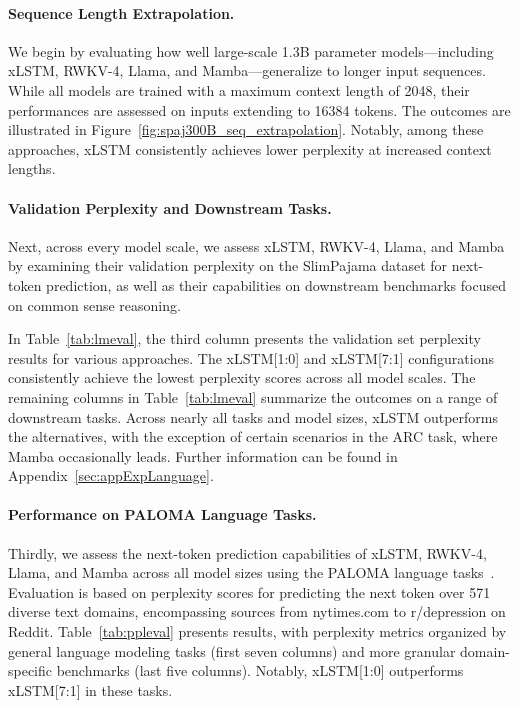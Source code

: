 \paragraph{Sequence Length Extrapolation.}
\label{sec:spaj300B_ctx_extrapolation}
We begin by evaluating how well large-scale 1.3B parameter models—including xLSTM, RWKV-4, Llama, and Mamba—generalize to longer input sequences. While all models are trained with a maximum context length of 2048, their performances are assessed on inputs extending to 16384 tokens. The outcomes are illustrated in Figure~\ref{fig:spaj300B_seq_extrapolation}. Notably, among these approaches, xLSTM consistently achieves lower perplexity at increased context lengths.

\paragraph{Validation Perplexity and Downstream Tasks.}
\label{sec:spaj_downstream_eval}
Next, across every model scale, we assess xLSTM, RWKV-4, Llama, and Mamba by examining their validation perplexity on the SlimPajama dataset for next-token prediction, as well as their capabilities on downstream benchmarks focused on common sense reasoning.

In Table~\ref{tab:lmeval}, the third column presents the validation set perplexity results for various approaches. The xLSTM[1:0] and xLSTM[7:1] configurations consistently achieve the lowest perplexity scores across all model scales. The remaining columns in Table~\ref{tab:lmeval} summarize the outcomes on a range of downstream tasks. Across nearly all tasks and model sizes, xLSTM outperforms the alternatives, with the exception of certain scenarios in the ARC task, where Mamba occasionally leads. Further information can be found in Appendix~\ref{sec:appExpLanguage}.

\paragraph{Performance on PALOMA Language Tasks.} Thirdly, we assess the next-token prediction capabilities of xLSTM, RWKV-4, Llama, and Mamba across all model sizes using the PALOMA language tasks~\citep{Magnusson:23arxivshort}. Evaluation is based on perplexity scores for predicting the next token over 571 diverse text domains, encompassing sources from nytimes.com to r/depression on Reddit. Table~\ref{tab:ppleval} presents results, with perplexity metrics organized by general language modeling tasks (first seven columns) and more granular domain-specific benchmarks (last five columns). Notably, xLSTM[1:0] outperforms xLSTM[7:1] in these tasks.

